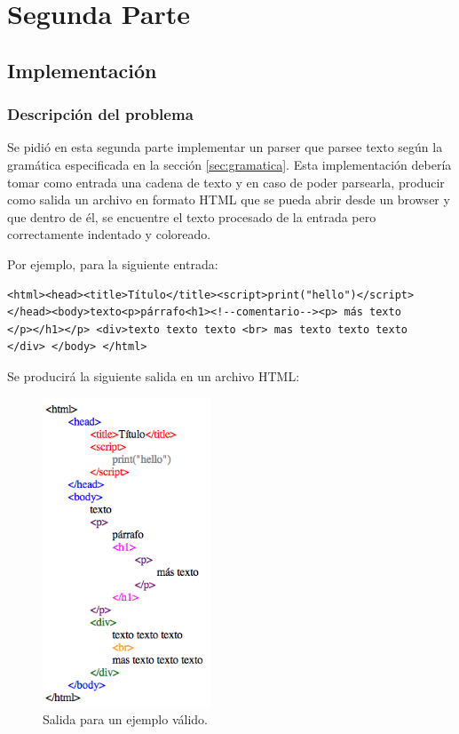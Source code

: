 \section{Segunda Parte}
\subsection{Implementaci\'on}
\subsubsection{Descripci\'on del problema}
Se pidió en esta segunda parte implementar un parser que parsee texto según la gramática especificada en la sección \ref{sec:gramatica}. Esta implementación debería tomar como entrada una cadena de texto y en caso de poder parsearla, producir como salida un archivo en formato HTML que se pueda abrir desde un browser y que dentro de él, se encuentre el texto procesado de la entrada pero correctamente indentado y coloreado.

Por ejemplo, para la siguiente entrada:

      \begin{verbatim}
<html><head><title>Título</title><script>print("hello")</script>
</head><body>texto<p>párrafo<h1><!--comentario--><p> más texto
</p></h1></p> <div>texto texto texto <br> mas texto texto texto
</div> </body> </html>\end{verbatim}

Se producirá la siguiente salida en un archivo HTML:

\begin{figure}[h!]
\includegraphics[width=5cm]{img/ejemplo1.png}
      \caption{Salida para un ejemplo válido.}
      \label{tbl:ejemplo}
\end{figure}

